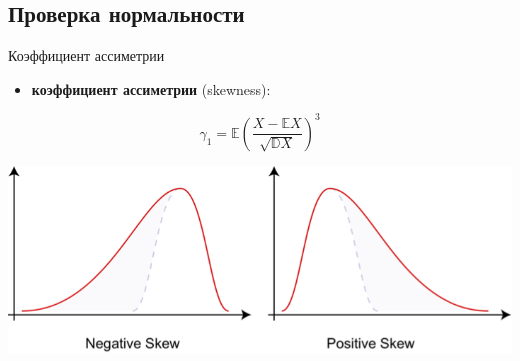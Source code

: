 \documentclass[9pt,pdf,utf8,hyperref={unicode},aspectratio=169]{beamer}
\begin{document}
\subsection{Проверка нормальности}
\begin{frame}{Коэффициент ассиметрии}
\begin{itemize}
	\item \textbf{коэффициент ассиметрии} (skewness):
	\end{itemize}
	$$\gamma_1 = \mathbb{E} \left( \frac{X-\mathbb{E}X} {\sqrt{\mathbb{D}X}} \right)^3$$
	\begin{center}
		\includegraphics[width=\textwidth]{skewness.png}
	\end{center}
	
\end{frame}
\end{document}
